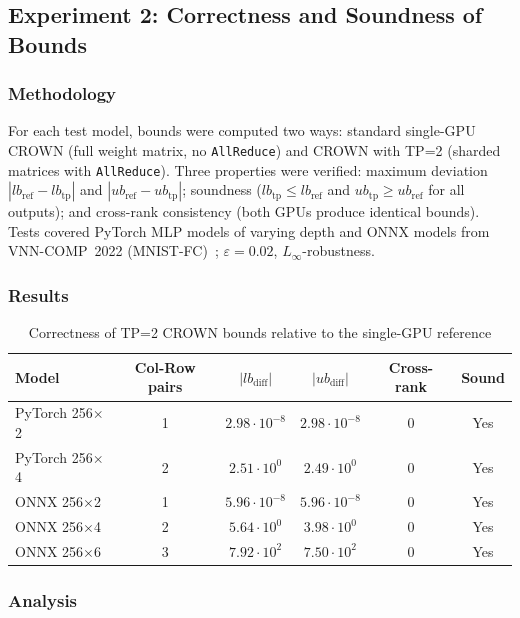 \subsection{Experiment 2: Correctness and Soundness of Bounds}

\subsubsection{Methodology}

For each test model, bounds were computed two ways: standard single-GPU CROWN
(full weight matrix, no \texttt{AllReduce}) and CROWN with TP=2 (sharded
matrices with \texttt{AllReduce}). Three properties were verified: maximum
deviation $|lb_{\text{ref}} - lb_{\text{tp}}|$ and
$|ub_{\text{ref}} - ub_{\text{tp}}|$; soundness
($lb_{\text{tp}} \leq lb_{\text{ref}}$ and $ub_{\text{tp}} \geq ub_{\text{ref}}$
for all outputs); and cross-rank consistency (both GPUs produce identical bounds).
Tests covered PyTorch MLP models of varying depth and ONNX models from
VNN-COMP~2022 (MNIST-FC)~\cite{arXiv2212VNNCOMP2022};
$\varepsilon = 0.02$, $L_\infty$-robustness.

\subsubsection{Results}

\begin{table}[htbp]
\centering
\caption{Correctness of TP=2 CROWN bounds relative to the single-GPU reference}
\label{tab:tp-correctness}
\begin{tabular}{lccccc}
\toprule
Model & Col-Row pairs & $|lb_{\text{diff}}|$ & $|ub_{\text{diff}}|$
    & Cross-rank & Sound \\
\midrule
PyTorch 256$\times$2 & 1 & $2.98 \cdot 10^{-8}$ & $2.98 \cdot 10^{-8}$ & 0 & Yes \\
PyTorch 256$\times$4 & 2 & $2.51 \cdot 10^{0}$  & $2.49 \cdot 10^{0}$  & 0 & Yes \\
ONNX 256$\times$2    & 1 & $5.96 \cdot 10^{-8}$ & $5.96 \cdot 10^{-8}$ & 0 & Yes \\
ONNX 256$\times$4    & 2 & $5.64 \cdot 10^{0}$  & $3.98 \cdot 10^{0}$  & 0 & Yes \\
ONNX 256$\times$6    & 3 & $7.92 \cdot 10^{2}$  & $7.50 \cdot 10^{2}$  & 0 & Yes \\
\bottomrule
\end{tabular}
\end{table}

\subsubsection{Analysis}

